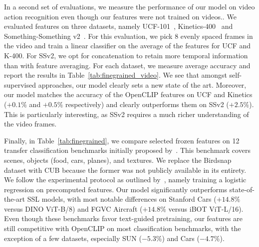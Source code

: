 In a second set of evaluations, we measure the performance of our model on video action recognition even though our features were not trained on videos..
We evaluated features on three datasets, namely UCF-101~\citep{soomro2012ucf101}, Kinetics-400~\citep{kay2017kinetics} and Something-Something v2~\citep{goyal2017something}.
For this evaluation, we pick $8$ evenly spaced frames in the video and train a linear classifier on the average of the features for UCF and K-400. 
For SSv2, we opt for concatenation to retain more temporal information than with feature averaging.
For each dataset, we measure average accuracy and report the results in Table~\ref{tab:finegrained_video}.
We see that amongst self-supervised approaches, our model clearly sets a new state of the art.
Moreover, our model matches the accuracy of the OpenCLIP features on UCF and Kinetics ($+0.1\%$ and $+0.5\%$ respectively) and clearly outperforms them on SSv2 ($+2.5\%$).
This is particularly interesting, as SSv2 requires a much richer understanding of the video frames.

Finally, in Table~\ref{tab:finegrained}, we compare selected frozen features on 12 transfer classification benchmarks initially proposed by~\citet{chen2020simple}.
This benchmark covers scenes, objects (food, cars, planes), and textures.
We replace the Birdsnap dataset with CUB because the former was not publicly available in its entirety.
We follow the experimental protocol as outlined by~\citet{chen2020simple}, namely training a logistic regression on precomputed features.
Our model significantly outperforms state-of-the-art SSL models, with most notable differences on Stanford Cars ($+14.8\%$ versus DINO ViT-B/8) and FGVC Aircraft ($+14.8\%$ versus iBOT ViT-L/16).
Even though these benchmarks favor text-guided pretraining, our features are still competitive with OpenCLIP on most classification benchmarks, with the exception of a few datasets, especially SUN ($-5.3\%$) and Cars ($-4.7\%$).


